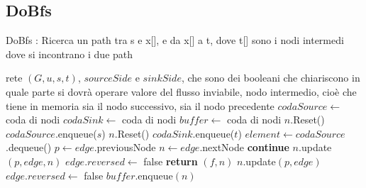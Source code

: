 \documentclass{article}
\begin{document}
\subsection{DoBfs}
\begin{algorithm}
    \caption{DoBfs : Ricerca un path tra s e x[], e da x[] a t, dove t[] sono i nodi intermedi dove si incontrano i due path}
    \begin{algorithmic}[1]
        \REQUIRE rete $(G,u,s,t)$, $sourceSide$ e $sinkSide$, che sono dei booleani che chiariscono in quale parte si dovrà operare
        \ENSURE valore del flusso inviabile, nodo intermedio, cioè che tiene in memoria sia il nodo successivo, sia il nodo precedente
        \STATE $codaSource \leftarrow$ coda di nodi
        \STATE $codaSink \leftarrow$ coda di nodi
        \STATE $buffer \leftarrow$ coda di nodi
        \STATE $n.$Reset()
        \ENDFOR
        \STATE $codaSource.$enqueue($s$)
        \ENDIF
        \STATE $n.$Reset()
        \ENDFOR
        \STATE $codaSink$.enqueue($t$)
        \ENDIF
        \STATE $element \leftarrow codaSource$.dequeue()
        \STATE $p \leftarrow edge.$previousNode
        \STATE $n \leftarrow edge.$nextNode
        \STATE \textbf{continue}
        \ELSE
        \STATE $n.$update$(p,edge,n)$
        \STATE $edge.reversed \leftarrow$ false
        \STATE \textbf{return} $(f,n)$
        \ENDIF
        \ENDIF
        \STATE $n.$update$(p,edge)$
        \STATE $edge.reversed \leftarrow$ false
        \STATE $buffer$.enqueue$(n)$
        \ENDIF
    \end{algorithmic}
\end{algorithm}
\newpage
\end{document}
